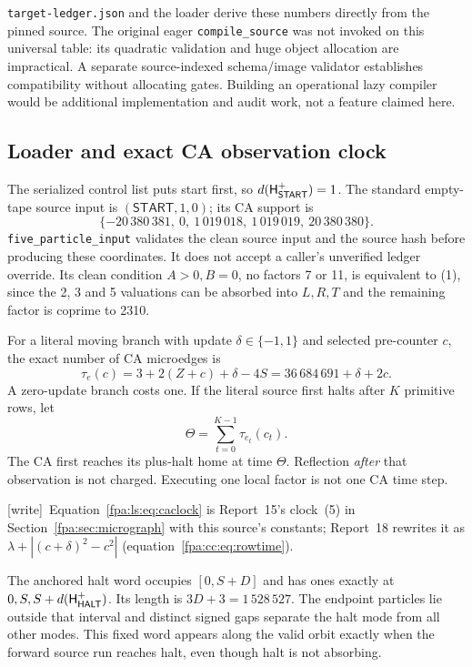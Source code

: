 \documentclass[11pt,a4paper]{article}
\numberwithin{equation}{section}
\newcommand{\START}{\mathsf{START}}
\newcommand{\code}[1]{\texttt{\small #1}}
\newcommand{\wtag}{\textup{[write]}}
\begin{document}
\code{target-ledger.json} and the loader derive these numbers directly from
the pinned source. The original eager \code{compile\_source} was not invoked
on this universal table: its quadratic validation and huge object allocation
are impractical. A separate source-indexed schema/image validator establishes
compatibility without allocating gates. Building an operational lazy compiler
would be additional implementation and audit work, not a feature claimed here.

\subsection{Loader and exact CA observation clock}
The serialized control list puts start first, so $d(\HH_{\START}^+)=1$.
The standard empty-tape source input is $(\START,1,0)$; its CA support is
\[
       \{-20\,380\,381,\ 0,\ 1\,019\,018,\ 1\,019\,019,\ 20\,380\,380\}.
                                                               \tag{28}
\]
\code{five\_particle\_input} validates the clean source input and the source
hash before producing these coordinates. It does not accept a caller's
unverified ledger override. Its clean condition $A>0,B=0$, no factors 7 or 11,
is equivalent to (1), since the 2, 3 and 5 valuations can be absorbed into
$L,R,T$ and the remaining factor is coprime to 2310.

For a literal moving branch with update $\delta\in\{-1,1\}$ and selected
pre-counter $c$, the exact number of CA microedges is
\[
 \tau_e(c)=3+2(Z+c)+\delta-4S
          =36\,684\,691+\delta+2c.                    \tag{29}\label{fpa:ls:eq:caclock}
\]
A zero-update branch costs one. If the literal source first halts after
$K$ primitive rows, let
\[
                        \Theta=\sum_{t=0}^{K-1}\tau_{e_t}(c_t).\tag{30}
\]
The CA first reaches its plus-halt home at time $\Theta$. Reflection
\emph{after} that observation is not charged. Executing one local factor is
not one CA time step.

\wtag\ Equation~\eqref{fpa:ls:eq:caclock} is Report~15's clock~(5) in Section~\ref{fpa:sec:micrograph} with this source's constants; Report~18 rewrites it as $\lambda+|(c+\delta)^2-c^2|$ (equation~\eqref{fpa:cc:eq:rowtime}).

The anchored halt word occupies $[0,S+D]$ and has ones exactly at
$0,S,S+d(\mathsf H_{\mathsf{HALT}}^+)$. Its length is $3D+3=1\,528\,527$. The endpoint
particles lie outside that interval and distinct signed gaps separate the
halt mode from all other modes. This fixed word appears along the valid
orbit exactly when the forward source run reaches halt, even though halt
is not absorbing.
\end{document}
